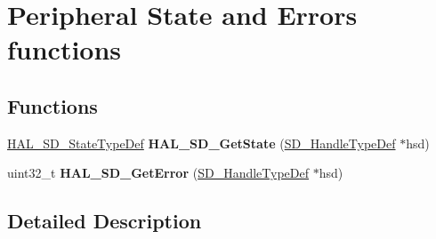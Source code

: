 \hypertarget{group___s_d___exported___functions___group5}{}\section{Peripheral State and Errors functions}
\label{group___s_d___exported___functions___group5}
\subsection*{Functions}
\begin{DoxyCompactItemize}
\item 
\mbox{\label{group___s_d___exported___functions___group5_ga903b0a06745cb70903c9c57ee47745ae}} 
\mbox{\hyperlink{group___s_d___exported___types___group1_ga0012126bcdfea270fe367bfaec2692ba}{H\+A\+L\+\_\+\+S\+D\+\_\+\+State\+Type\+Def}} {\bfseries H\+A\+L\+\_\+\+S\+D\+\_\+\+Get\+State} (\mbox{\hyperlink{group___s_d___exported___types___group3_ga1f31eb64a86b0c740bb5c02fa4c9914d}{S\+D\+\_\+\+Handle\+Type\+Def}} $\ast$hsd)
\item 
\mbox{\label{group___s_d___exported___functions___group5_ga20d0eb80609d0db3c561406e2fb38b2c}} 
uint32\+\_\+t {\bfseries H\+A\+L\+\_\+\+S\+D\+\_\+\+Get\+Error} (\mbox{\hyperlink{group___s_d___exported___types___group3_ga1f31eb64a86b0c740bb5c02fa4c9914d}{S\+D\+\_\+\+Handle\+Type\+Def}} $\ast$hsd)
\end{DoxyCompactItemize}


\subsection{Detailed Description}
